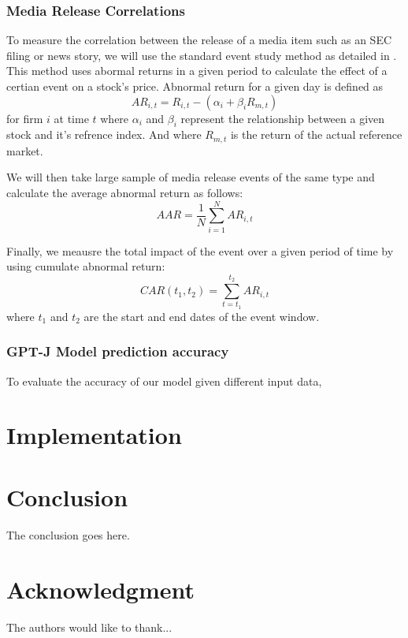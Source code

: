 \documentclass[conference]{IEEEtran}
\begin{document}
\subsubsection{Media Release Correlations}
To measure the correlation between the release of a media item such as an SEC filing or news story, we will use the standard event study method as detailed in \cite{Neuhierl2010}. This method uses abormal returns in a given period to calculate the effect of a certian event on a stock's price. Abnormal return for a given day is defined as 
\begin{equation}
    AR_{i,t}=R_{i,t}-(\alpha_i+\beta_i R_{m,t})
\end{equation}
for firm $i$ at time $t$ where $\alpha_i$ and $\beta_i$ represent the relationship between a given stock and it's refrence index. And where $R_{m,t}$ is the return of the actual reference market.

We will then take large sample of media release events of the same type and calculate the average abnormal return as follows:
\begin{equation}
    AAR= \frac{1}{N} \sum\limits_{i=1}^{N}AR_{i,t}
\end{equation}

Finally, we meausre the total impact of the event over a given period of time by using cumulate abnormal return:
\begin{equation}
    CAR(t_1,t_2)=\sum\limits_{t=t_1}^{t_2} AR_{i,t} 
\end{equation}
where $t_1$ and $t_2$ are the start and end dates of the event window.
\subsubsection{GPT-J Model prediction accuracy}
To evaluate the accuracy of our model given different input data, 
\section{Implementation}
\section{Conclusion}
The conclusion goes here.

\section*{Acknowledgment}
The authors would like to thank... 




\end{document}
